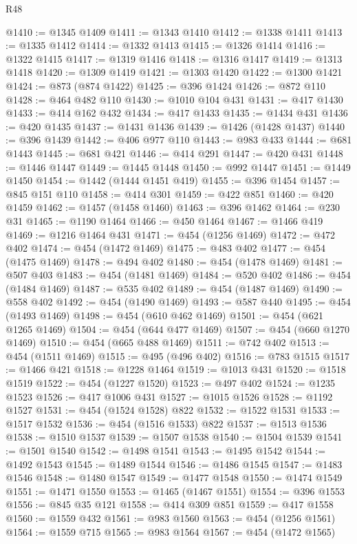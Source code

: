 \begin{lexlean}{R48}
\begin{coremodule}
@1410 := @1345 @1409
@1411 := @1343 @1410
@1412 := @1338 @1411
@1413 := @1335 @1412
@1414 := @1332 @1413
@1415 := @1326 @1414
@1416 := @1322 @1415
@1417 := @1319 @1416
@1418 := @1316 @1417
@1419 := @1313 @1418
@1420 := @1309 @1419
@1421 := @1303 @1420
@1422 := @1300 @1421
@1424 := @873 (@874 @1422)
@1425 := @396 @1424
@1426 := @872 @110
@1428 := @464 @482 @110
@1430 := @1010 @104 @431
@1431 := @417 @1430
@1433 := @414 @162 @432
@1434 := @417 @1433
@1435 := @1434 @431
@1436 := @420 @1435
@1437 := @1431 @1436
@1439 := @1426 (@1428 @1437)
@1440 := @396 @1439
@1442 := @406 @977 @110
@1443 := @983 @433
@1444 := @681 @1443
@1445 := @681 @421
@1446 := @414 @291
@1447 := @420 @431
@1448 := @1446 @1447
@1449 := @1445 @1448
@1450 := @992 @1447
@1451 := @1449 @1450
@1454 := @1442 (@1444 @1451 @419)
@1455 := @396 @1454
@1457 := @845 @151 @110
@1458 := @414 @301
@1459 := @422 @851
@1460 := @420 @1459
@1462 := @1457 (@1458 @1460)
@1463 := @396 @1462
@1464 := @230 @31
@1465 := @1190 @1464
@1466 := @450 @1464
@1467 := @1466 @419
@1469 := @1216 @1464 @431
@1471 := @454 (@1256 @1469)
@1472 := @472 @402
@1474 := @454 (@1472 @1469)
@1475 := @483 @402
@1477 := @454 (@1475 @1469)
@1478 := @494 @402
@1480 := @454 (@1478 @1469)
@1481 := @507 @403
@1483 := @454 (@1481 @1469)
@1484 := @520 @402
@1486 := @454 (@1484 @1469)
@1487 := @535 @402
@1489 := @454 (@1487 @1469)
@1490 := @558 @402
@1492 := @454 (@1490 @1469)
@1493 := @587 @440
@1495 := @454 (@1493 @1469)
@1498 := @454 (@610 @462 @1469)
@1501 := @454 (@621 @1265 @1469)
@1504 := @454 (@644 @477 @1469)
@1507 := @454 (@660 @1270 @1469)
@1510 := @454 (@665 @488 @1469)
@1511 := @742 @402
@1513 := @454 (@1511 @1469)
@1515 := @495 (@496 @402)
@1516 := @783 @1515
@1517 := @1466 @421
@1518 := @1228 @1464
@1519 := @1013 @431
@1520 := @1518 @1519
@1522 := @454 (@1227 @1520)
@1523 := @497 @402
@1524 := @1235 @1523
@1526 := @417 @1006 @431
@1527 := @1015 @1526
@1528 := @1192 @1527
@1531 := @454 (@1524 @1528) @822
@1532 := @1522 @1531
@1533 := @1517 @1532
@1536 := @454 (@1516 @1533) @822
@1537 := @1513 @1536
@1538 := @1510 @1537
@1539 := @1507 @1538
@1540 := @1504 @1539
@1541 := @1501 @1540
@1542 := @1498 @1541
@1543 := @1495 @1542
@1544 := @1492 @1543
@1545 := @1489 @1544
@1546 := @1486 @1545
@1547 := @1483 @1546
@1548 := @1480 @1547
@1549 := @1477 @1548
@1550 := @1474 @1549
@1551 := @1471 @1550
@1553 := @1465 (@1467 @1551)
@1554 := @396 @1553
@1556 := @845 @35 @121
@1558 := @414 @309 @851
@1559 := @417 @1558
@1560 := @1559 @432
@1561 := @983 @1560
@1563 := @454 (@1256 @1561)
@1564 := @1559 @715
@1565 := @983 @1564
@1567 := @454 (@1472 @1565)

\end{coremodule}
\end{lexlean}
